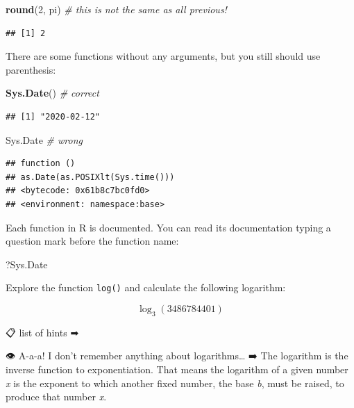 \documentclass[
]{book}
\makeatletter
\newenvironment{Shaded}{\begin{snugshade}}{\end{snugshade}}
\newcommand{\CommentTok}[1]{\textcolor[rgb]{0.56,0.35,0.01}{\textit{#1}}}
\newcommand{\DecValTok}[1]{\textcolor[rgb]{0.00,0.00,0.81}{#1}}
\newcommand{\KeywordTok}[1]{\textcolor[rgb]{0.13,0.29,0.53}{\textbf{#1}}}
\newcommand{\NormalTok}[1]{#1}
\newenvironment{kframe}{%
\medskip{}
\setlength{\fboxsep}{.8em}
 \def\at@end@of@kframe{}%
 \ifinner\ifhmode%
  \def\at@end@of@kframe{\end{minipage}}%
  \begin{minipage}{\columnwidth}%
 \fi\fi%
 \def\FrameCommand##1{\hskip\@totalleftmargin \hskip-\fboxsep
 \colorbox{shadecolor}{##1}\hskip-\fboxsep
     \hskip-\linewidth \hskip-\@totalleftmargin \hskip\columnwidth}%
 \MakeFramed {\advance\hsize-\width
   \@totalleftmargin\z@ \linewidth\hsize
   \@setminipage}}%
 {\par\unskip\endMakeFramed%
 \at@end@of@kframe}
\newenvironment{rmdblock}[1]
  {
  \begin{itemize}
  \renewcommand{\labelitemi}{
    \raisebox{-.7\height}[0pt][0pt]{
      {\setkeys{Gin}{width=3em,keepaspectratio}\texttt{[image: images/\#1]}}
    }
  }
  \setlength{\fboxsep}{1em}
  \begin{kframe}
  \item
  }
  {
  \end{kframe}
  \end{itemize}
  }
\newenvironment{rmdtask}
  {\begin{rmdblock}{task}}
  {\end{rmdblock}}
\makeatother
\begin{document}
\begin{Shaded}
\begin{Highlighting}[]
\KeywordTok{round}\NormalTok{(}\DecValTok{2}\NormalTok{, pi) }\CommentTok{# this is not the same as all previous!}
\end{Highlighting}
\end{Shaded}

\begin{verbatim}
## [1] 2
\end{verbatim}

There are some functions without any arguments, but you still should use parenthesis:

\begin{Shaded}
\begin{Highlighting}[]
\KeywordTok{Sys.Date}\NormalTok{() }\CommentTok{# correct}
\end{Highlighting}
\end{Shaded}

\begin{verbatim}
## [1] "2020-02-12"
\end{verbatim}

\begin{Shaded}
\begin{Highlighting}[]
\NormalTok{Sys.Date }\CommentTok{# wrong}
\end{Highlighting}
\end{Shaded}

\begin{verbatim}
## function () 
## as.Date(as.POSIXlt(Sys.time()))
## <bytecode: 0x61b8c7bc0fd0>
## <environment: namespace:base>
\end{verbatim}

Each function in R is documented. You can read its documentation typing a question mark before the function name:

\begin{Shaded}
\begin{Highlighting}[]
\NormalTok{?Sys.Date}
\end{Highlighting}
\end{Shaded}

\begin{rmdtask}
Explore the function \texttt{log()} and calculate the following
logarithm:
\end{rmdtask}

\[\log_3(3486784401)\]

📋 list of hints ➡

👁 A-a-a! I don't remember anything about logarithms\ldots{} ➡
The logarithm is the inverse function to exponentiation. That means the logarithm of a given number \emph{x} is the exponent to which another fixed number, the base \emph{b}, must be raised, to produce that number \emph{x}.
\end{document}
